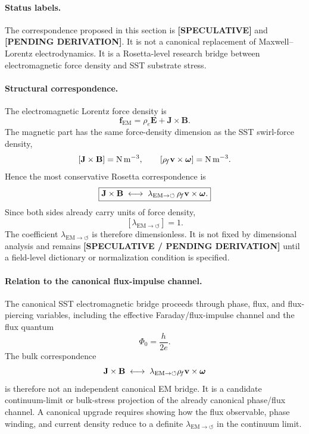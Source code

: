 \paragraph{Status labels.}
The correspondence proposed in this section is \textbf{[SPECULATIVE]} and
\textbf{[PENDING DERIVATION]}.  It is not a canonical replacement of
Maxwell--Lorentz electrodynamics.  It is a Rosetta-level research bridge
between electromagnetic force density and SST substrate stress.

\paragraph{Structural correspondence.}
The electromagnetic Lorentz force density is
\[
\mathbf f_{\mathrm{EM}}
=
\rho_e\mathbf E+\mathbf J\times\mathbf B .
\]
The magnetic part has the same force-density dimension as the SST
swirl-force density,
\[
[\mathbf J\times\mathbf B]
=
\mathrm{N\,m^{-3}},
\qquad
[\rho_{\!f}\mathbf v\times\boldsymbol{\omega}]
=
\mathrm{N\,m^{-3}}.
\]
Hence the most conservative Rosetta correspondence is
\[
\boxed{
\mathbf J\times\mathbf B
\;\longleftrightarrow\;
\lambda_{\mathrm{EM}\to\circlearrowleft}\,
\rho_{\!f}\mathbf v\times\boldsymbol{\omega}.
}
\]
Since both sides already carry units of force density,
\[
\boxed{
[\lambda_{\mathrm{EM}\to\circlearrowleft}]=1 .
}
\]
The coefficient
\(\lambda_{\mathrm{EM}\to\circlearrowleft}\) is therefore dimensionless.
It is not fixed by dimensional analysis and remains
\textbf{[SPECULATIVE / PENDING DERIVATION]} until a field-level dictionary or
normalization condition is specified.

\paragraph{Relation to the canonical flux-impulse channel.}
The canonical SST electromagnetic bridge proceeds through phase, flux, and
flux-piercing variables, including the effective Faraday/flux-impulse
channel and the flux quantum
\[
\Phi_0=\frac{h}{2e}.
\]
The bulk correspondence
\[
\mathbf J\times\mathbf B
\;\longleftrightarrow\;
\lambda_{\mathrm{EM}\to\circlearrowleft}
\rho_{\!f}\mathbf v\times\boldsymbol{\omega}
\]
is therefore not an independent canonical EM bridge.  It is a candidate
continuum-limit or bulk-stress projection of the already canonical
phase/flux channel.  A canonical upgrade requires showing how the flux
observable, phase winding, and current density reduce to a definite
\(\lambda_{\mathrm{EM}\to\circlearrowleft}\) in the continuum limit.

